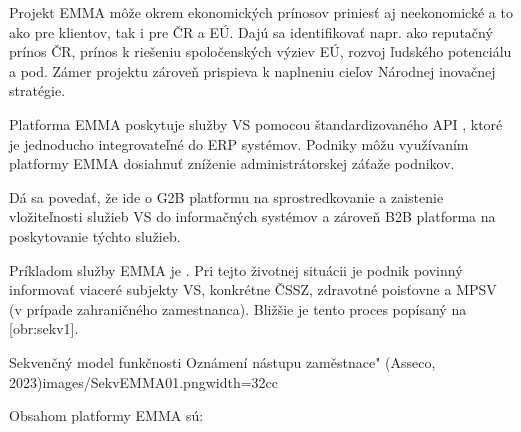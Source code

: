 
Projekt EMMA môže okrem ekonomických prínosov priniesť aj neekonomické a to ako pre klientov, tak i pre ČR a EÚ. Dajú sa identifikovať napr. ako reputačný prínos ČR, prínos k riešeniu spoločenských výziev EÚ, rozvoj ľudského potenciálu a pod. Zámer projektu zároveň prispieva k naplneniu cieľov Národnej inovačnej stratégie.

Platforma EMMA poskytuje služby VS pomocou štandardizovaného API
, ktoré je jednoducho integrovateľné do ERP systémov. Podniky môžu využívaním platformy EMMA dosiahnuť zníženie administrátorskej záťaže podnikov. 

Dá sa povedať, že ide o G2B platformu na sprostredkovanie a zaistenie vložiteľnosti služieb VS do informačných systémov a zároveň B2B platforma na poskytovanie týchto služieb.

Príkladom služby EMMA je . Pri tejto životnej situácii je podnik povinný informovať viaceré subjekty VS, konkrétne ČSSZ, zdravotné poisťovne a MPSV (v prípade zahraničného zamestnanca). Bližšie je tento proces popísaný na [obr:sekv1].

{Sekvenčný model funkčnosti Oznámení nástupu zaměstnace" (Asseco, 2023)}{images/SekvEMMA01.png}{width=32cc}

Obsahom platformy EMMA sú:

